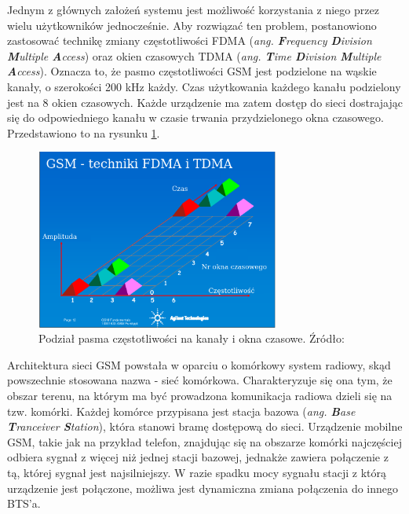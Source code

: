 Jednym z głównych założeń systemu jest możliwość korzystania z niego przez wielu użytkowników jednocześnie. Aby rozwiązać ten problem, postanowiono zastosować technikę zmiany częstotliwości FDMA (\textit{ang. \textbf{F}requency \textbf{D}ivision \textbf{M}ultiple \textbf{A}ccess}) oraz okien czasowych TDMA (\textit{ang. \textbf{T}ime \textbf{D}ivision \textbf{M}ultiple \textbf{A}ccess}). Oznacza to, że pasmo częstotliwości GSM jest podzielone na wąskie kanały, o szerokości 200 kHz każdy. Czas użytkowania każdego kanału podzielony jest na 8 okien czasowych. Każde urządzenie ma zatem dostęp do sieci dostrajając się do odpowiedniego kanału w czasie trwania przydzielonego okna czasowego. Przedstawiono to na rysunku \ref{fig:image_gsm_frequencies_timeslots}.

\begin{figure}[H]
	\centering
	\includegraphics[width=8cm]{img/theory/GSM/gsm_timeslots_frequencies.png}
	\caption{Podział pasma częstotliwości na kanały i okna czasowe. Źródło: \cite{GSM}}
	\label{fig:image_gsm_frequencies_timeslots}
\end{figure}


Architektura sieci GSM powstała w oparciu o komórkowy system radiowy, skąd powszechnie stosowana nazwa - sieć komórkowa. Charakteryzuje się ona tym, że obszar terenu, na którym ma być prowadzona komunikacja radiowa dzieli się na tzw. komórki. Każdej komórce przypisana jest stacja bazowa (\textit{ang. \textbf{B}ase \textbf{T}ranceiver \textbf{S}tation}), która stanowi bramę dostępową do sieci. Urządzenie mobilne GSM, takie jak na przykład telefon, znajdując się na obszarze komórki najczęściej odbiera sygnał z więcej niż jednej stacji bazowej, jednakże zawiera połączenie z tą, której sygnał jest najsilniejszy. W razie spadku mocy sygnału stacji z którą urządzenie jest połączone, możliwa jest dynamiczna zmiana połączenia do innego BTS'a.

